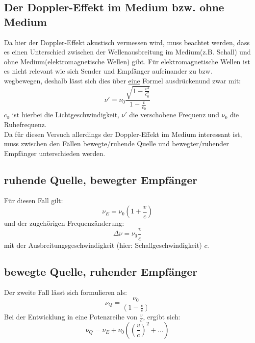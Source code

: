 \subsection{Der Doppler-Effekt im Medium bzw. ohne Medium}
Da hier der Doppler-Effekt akustisch vermessen wird, muss beachtet werden, dass es einen Unterschied zwischen der Wellenausbreitung im Medium(z.B. Schall) und ohne Medium(elektromagnetische Wellen) gibt. Für elektromagnetische Wellen ist es nicht relevant wie sich Sender und Empfänger aufeinander zu bzw. wegbewegen, deshalb lässt sich dies über \underline{eine} Formel ausdrückenund zwar mit:
\begin{equation}
\nu'=\nu_0 \frac{\sqrt{1-\frac{v^2}{c_0^2}}}{1-\frac{v}{c_0}} 
\end{equation}
$c_0$ ist hierbei die Lichtgeschwindigkeit, $\nu'$ die verschobene Frequenz und $\nu_0$ die Ruhefrequenz. \\
Da für diesen Versuch allerdings der Doppler-Effekt im Medium interessant ist, muss zwischen den Fällen bewegte/ruhende Quelle und bewegter/ruhender Empfänger unterschieden werden.
\subsection{ruhende Quelle, bewegter Empfänger}
Für diesen Fall gilt:
\begin{equation}
\nu_E=\nu_0 \left( 1+\frac{v}{c}\right) 
\end{equation}
und der zugehörigen Frequenzänderung:
\begin{equation}
\Delta\nu=\nu_0 \frac{v}{c}
\label{eq:Theorie_BewegterEmpfänger}
\end{equation}
mit der Ausbreitungsgeschwindigkeit (hier: Schallgeschwindigkeit) $c$.
\newpage
\subsection{bewegte Quelle, ruhender Empfänger}
Der zweite Fall lässt sich formulieren als:
\begin{equation}
\nu_Q=\frac{\nu_0}{(1-\frac{v}{c})}
\label{eq:Theorie_BewegterSender}
\end{equation}
Bei der Entwicklung in eine Potenzreihe von $\frac{v}{c}$, ergibt sich:
\begin{equation}
\nu_Q=\nu_E + \nu_0\left( \left( \frac{v}{c}\right)^2+... \right) 
\end{equation}
